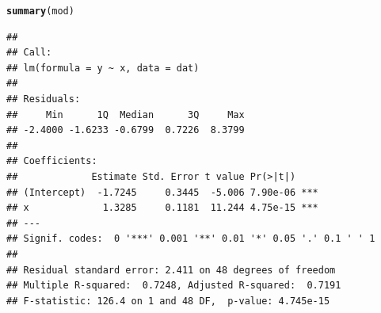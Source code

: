\documentclass{article}\usepackage[]{graphicx}\usepackage[]{xcolor}
\makeatletter
\newcommand{\hlnum}[1]{\textcolor[rgb]{0.686,0.059,0.569}{#1}}%
\newcommand{\hlopt}[1]{\textcolor[rgb]{0,0,0}{#1}}%
\newcommand{\hldef}[1]{\textcolor[rgb]{0.345,0.345,0.345}{#1}}%
\newcommand{\hlkwa}[1]{\textcolor[rgb]{0.161,0.373,0.58}{\textbf{#1}}}%
\newcommand{\hlkwb}[1]{\textcolor[rgb]{0.69,0.353,0.396}{#1}}%
\newcommand{\hlkwc}[1]{\textcolor[rgb]{0.333,0.667,0.333}{#1}}%
\newcommand{\hlkwd}[1]{\textcolor[rgb]{0.737,0.353,0.396}{\textbf{#1}}}%
\newenvironment{kframe}{%
 \def\at@end@of@kframe{}%
 \ifinner\ifhmode%
  \def\at@end@of@kframe{\end{minipage}}%
  \begin{minipage}{\columnwidth}%
 \fi\fi%
 \def\FrameCommand##1{\hskip\@totalleftmargin \hskip-\fboxsep
 \colorbox{shadecolor}{##1}\hskip-\fboxsep
     \hskip-\linewidth \hskip-\@totalleftmargin \hskip\columnwidth}%
 \MakeFramed {\advance\hsize-\width
   \@totalleftmargin\z@ \linewidth\hsize
   \@setminipage}}%
 {\par\unskip\endMakeFramed%
 \at@end@of@kframe}
\newenvironment{knitrout}{}{} %
\makeatother
\begin{document}
\begin{enumerate}
\begin{knitrout}
\begin{kframe}
\begin{alltt}
\hlkwd{summary}\hldef{(mod)}
\end{alltt}
\begin{verbatim}
## 
## Call:
## lm(formula = y ~ x, data = dat)
## 
## Residuals:
##     Min      1Q  Median      3Q     Max 
## -2.4000 -1.6233 -0.6799  0.7226  8.3799 
## 
## Coefficients:
##             Estimate Std. Error t value Pr(>|t|)    
## (Intercept)  -1.7245     0.3445  -5.006 7.90e-06 ***
## x             1.3285     0.1181  11.244 4.75e-15 ***
## ---
## Signif. codes:  0 '***' 0.001 '**' 0.01 '*' 0.05 '.' 0.1 ' ' 1
## 
## Residual standard error: 2.411 on 48 degrees of freedom
## Multiple R-squared:  0.7248,	Adjusted R-squared:  0.7191 
## F-statistic: 126.4 on 1 and 48 DF,  p-value: 4.745e-15
\end{verbatim}
\end{kframe}
\end{knitrout}
\end{enumerate}
\end{document}

